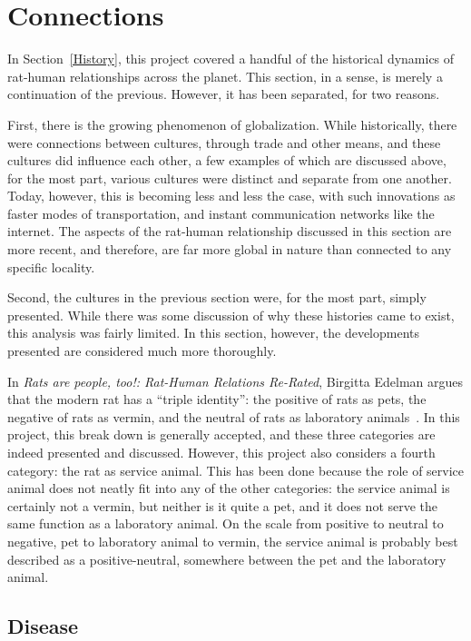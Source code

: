 \documentclass[12pt]{article}
\begin{document}
\section{Connections} \label{Connections}

In Section~\ref{History}, this project covered a handful of the historical dynamics of rat-human relationships across the planet. This section, in a sense, is merely a continuation of the previous. However, it has been separated, for two reasons.

First, there is the growing phenomenon of globalization. While historically, there were connections between cultures, through trade and other means, and these cultures did influence each other, a few examples of which are discussed above, for the most part, various cultures were distinct and separate from one another. Today, however, this is becoming less and less the case, with such innovations as faster modes of transportation, and instant communication networks like the internet. The aspects of the rat-human relationship discussed in this section are more recent, and therefore, are far more global in nature than connected to any specific locality.

Second, the cultures in the previous section were, for the most part, simply presented. While there was some discussion of why these histories came to exist, this analysis was fairly limited. In this section, however, the developments presented are considered much more thoroughly.

In \textit{Rats are people, too!: Rat-Human Relations Re-Rated}, Birgitta Edelman argues that the modern rat has a ``triple identity'': the positive of rats as pets, the negative of rats as vermin, and the neutral of rats as laboratory animals~\cite{Edelman2002}. In this project, this break down is generally accepted, and these three categories are indeed presented and discussed. However, this project also considers a fourth category: the rat as service animal. This has been done because the role of service animal does not neatly fit into any of the other categories: the service animal is certainly not a vermin, but neither is it quite a pet, and it does not serve the same function as a laboratory animal. On the scale from positive to neutral to negative, pet to laboratory animal to vermin, the service animal is probably best described as a positive-neutral, somewhere between the pet and the laboratory animal.

\subsection{Disease} \label{Disease}
\end{document}
